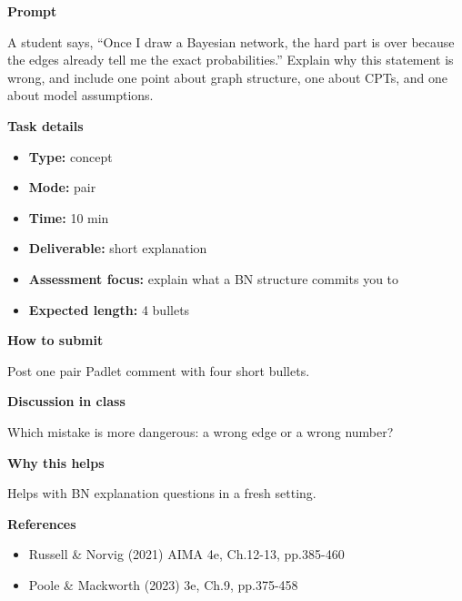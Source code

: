 \documentclass[11pt]{article}
\begin{document}
\begin{tcolorbox}[colback=white,colframe=MidnightBlue,title={Q1 BN Structure and Assumptions},fonttitle=\bfseries,breakable]
\begin{center}
\end{center}

{\large\bfseries\color{MidnightBlue} Prompt}\par\medskip
A student says, ``Once I draw a Bayesian network, the hard part is over because the edges already tell me the exact probabilities.'' Explain why this statement is wrong, and include one point about graph structure, one about CPTs, and one about model assumptions.

{\large\bfseries\color{MidnightBlue} Task details}\par\medskip
\begin{itemize}\item \textbf{Type:} concept
\item \textbf{Mode:} pair
\item \textbf{Time:} 10 min
\item \textbf{Deliverable:} short explanation
\item \textbf{Assessment focus:} explain what a BN structure commits you to
\item \textbf{Expected length:} 4 bullets\end{itemize}

{\large\bfseries\color{MidnightBlue} How to submit}\par\medskip
Post one pair Padlet comment with four short bullets.

{\large\bfseries\color{MidnightBlue} Discussion in class}\par\medskip
Which mistake is more dangerous: a wrong edge or a wrong number?

{\large\bfseries\color{MidnightBlue} Why this helps}\par\medskip
Helps with BN explanation questions in a fresh setting.

{\large\bfseries\color{MidnightBlue} References}\par\medskip
\begin{itemize}\item Russell \& Norvig (2021) AIMA 4e, Ch.12-13, pp.385-460
\item Poole \& Mackworth (2023) 3e, Ch.9, pp.375-458\end{itemize}
\end{tcolorbox}
\end{document}

